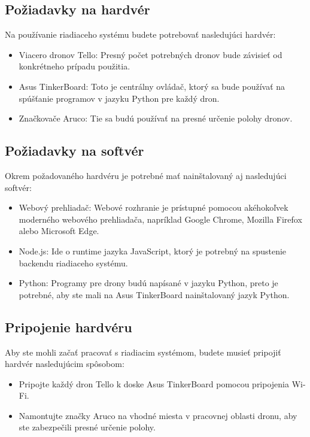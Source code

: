 \documentclass[a4paper]{feidippp}
\begin{document}
\subsection{Požiadavky na hardvér}
Na používanie riadiaceho systému budete potrebovať nasledujúci hardvér:
\begin{itemize}
    \item Viacero dronov Tello: Presný počet potrebných dronov bude závisieť od konkrétneho prípadu použitia.
    \item Asus TinkerBoard: Toto je centrálny ovládač, ktorý sa bude používať na spúšťanie programov v jazyku Python pre každý dron.
    \item Značkovače Aruco: Tie sa budú používať na presné určenie polohy dronov.
\end{itemize}

\subsection{Požiadavky na softvér}
Okrem požadovaného hardvéru je potrebné mať nainštalovaný aj nasledujúci softvér:

\begin{itemize}
  \item Webový prehliadač: Webové rozhranie je prístupné pomocou akéhokoľvek moderného webového prehliadača, napríklad Google Chrome, Mozilla Firefox alebo Microsoft Edge.
  \item Node.js: Ide o runtime jazyka JavaScript, ktorý je potrebný na spustenie backendu riadiaceho systému.
  \item Python: Programy pre drony budú napísané v jazyku Python, preto je potrebné, aby ste mali na Asus TinkerBoard nainštalovaný jazyk Python.
\end{itemize}

\subsection{Pripojenie hardvéru}
Aby ste mohli začať pracovať s riadiacim systémom, budete musieť pripojiť hardvér nasledujúcim spôsobom:

\begin{itemize}
  \item Pripojte každý dron Tello k doske Asus TinkerBoard pomocou pripojenia Wi-Fi.
  \item Namontujte značky Aruco na vhodné miesta v pracovnej oblasti dronu, aby ste zabezpečili presné určenie polohy.
\end{itemize}
\end{document}
